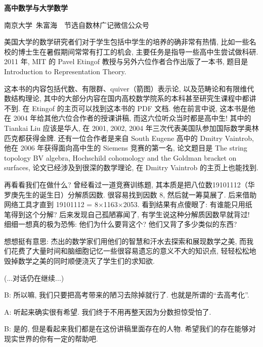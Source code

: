\begin{pas}
	\begin{center}
		\large \textbf{高中数学与大学数学}
	\end{center}
	\begin{center}
		南京大学~朱富海~~节选自数林广记微信公众号
	\end{center}
	
	美国大学的数学研究者们对于学生包括中学生的培养的确非常有热情, 比如一些名校的博士生在暑假期间常常有打工的机会, 主要任务是指导一些高中生尝试做科研. 2011 年, MIT 的 Pavel Etingof 教授与另外六位作者合作出版了一本书, 题目是 Introduction to Representation Theory.
	
	这本书的内容包括代数、有限群、quiver（箭图）表示论, 以及范畴论和有限维代数结构理论, 其中的大部分内容在国内高校数学院系的本科甚至研究生课程中都讲不到. 在 Etingof 的主页可以找到这本书的 PDF 文档. 他在前言中说, 这本书是他在 2004 年给其他六位合作者的授课讲稿, 而这六位听众当时都是高中生! 其中的 Tiankai Liu 应该是华人, 在 2001, 2002, 2004 年三次代表美国队参加国际数学奥林匹克都获得金牌. 还有一位合作者是来自 South Eugene 高中的 Dmitry Vaintrob, 他在 2006 年获得面向高中生的 Siemens 竞赛的第一名, 论文题目是 The string topology BV algebra, Hochschild cohomology and the Goldman bracket on surfaces, 论文已经涉及到很深的数学理论, 在 Dmitry Vaintrob 的主页上也能找到.
	
	再看看我们在做什么? 曾经看过一道竞赛训练题, 其本质是把八位数19101112（华罗庚先生的诞生日）分解质因数. 很容易找到因数 8, 然后就一筹莫展了. 后来借助网络工具才直到 19101112 = 8×1163×2053. 看到结果有点傻眼了: 有谁能只用纸笔得到这个分解? 后来发现自己孤陋寡闻了, 有学生说这种分解质因数早就背过! 细细一想真的极为恐怖: 他们为什么要背这个? 他们又背了多少类似的东西?
	
	想想挺有意思: 杰出的数学家们用他们的智慧和汗水去探索和展现数学之美, 而我们花费了大量时间和脑细胞记忆一些很容易遗忘的意义不大的知识点, 轻轻松松地毁掉数学之美的同时顺便浇灭了学生们的求知欲.

\end{pas}

\begin{dialogue}
\begin{center}
(...对话仍在继续...)	
\end{center}
	B: 所以嘛, 我们只要把高考带来的陋习去除掉就行了. 也就是所谓的``去高考化''.
	
	A: 听起来确实很有希望. 我们终于不用再整天因为分数担惊受怕了.
	
	B: 是的, 但是看起来我们都是在这份讲稿里面存在的人物. 希望我们的存在能够对现实世界的你有一定的帮助吧. 
\end{dialogue}

